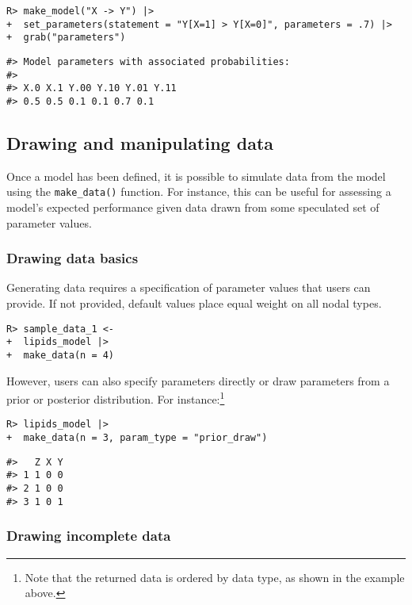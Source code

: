 \documentclass[
  11pt,
  article]{jss}
\begin{document}
\begin{verbatim}
R> make_model("X -> Y") |>
+  set_parameters(statement = "Y[X=1] > Y[X=0]", parameters = .7) |>
+  grab("parameters")
\end{verbatim}

\begin{verbatim}
#> Model parameters with associated probabilities: 
#> 
#> X.0 X.1 Y.00 Y.10 Y.01 Y.11
#> 0.5 0.5 0.1 0.1 0.7 0.1
\end{verbatim}

\hypertarget{drawing-and-manipulating-data}{%
\subsection{Drawing and manipulating
data}\label{drawing-and-manipulating-data}}

Once a model has been defined, it is possible to simulate data from the
model using the \texttt{make\_data()} function. For instance, this can
be useful for assessing a model's expected performance given data drawn
from some speculated set of parameter values.

\hypertarget{drawing-data-basics}{%
\subsubsection{Drawing data basics}\label{drawing-data-basics}}

Generating data requires a specification of parameter values that users
can provide. If not provided, default values place equal weight on all
nodal types.

\begin{verbatim}
R> sample_data_1 <- 
+  lipids_model |> 
+  make_data(n = 4)
\end{verbatim}

However, users can also specify parameters directly or draw parameters
from a prior or posterior distribution. For instance:\footnote{Note that
  the returned data is ordered by data type, as shown in the example
  above.}

\begin{verbatim}
R> lipids_model |>
+  make_data(n = 3, param_type = "prior_draw")
\end{verbatim}

\begin{verbatim}
#>   Z X Y
#> 1 1 0 0
#> 2 1 0 0
#> 3 1 0 1
\end{verbatim}

\hypertarget{drawing-incomplete-data}{%
\subsubsection{Drawing incomplete data}\label{drawing-incomplete-data}}
\end{document}

